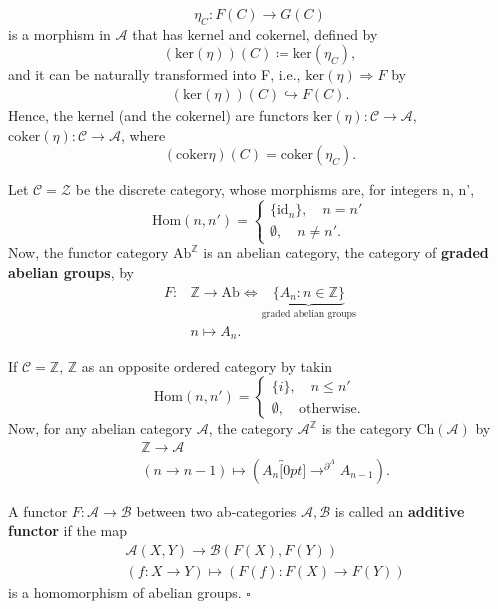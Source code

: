 \documentclass[../category_theory.tex]{subfiles}
\begin{document}
\[
	\eta_{C}:F(C)\rightarrow G(C)
\]
is a morphism in \(\mathcal{A}\) that has kernel and cokernel, defined by
\[
	(\mathrm{ker}(\eta ))(C)\coloneqq \mathrm{ker}(\eta_{C}),
\]
and it can be naturally transformed into F, i.e., \(\mathrm{ker}(\eta )\Rightarrow F\) by
\begin{align*}
	(\mathrm{ker}(\eta ))(C)\hookrightarrow F(C).
\end{align*}
Hence, the kernel (and the cokernel) are functors \(\mathrm{ker}(\eta ):\mathcal{C}\rightarrow \mathcal{A}\), \(\mathrm{coker}(\eta ):\mathcal{C}\rightarrow \mathcal{A}\), where
\[
	(\mathrm{coker}\eta )(C)=\mathrm{coker}(\eta_{C}).
\]
\begin{example}
	Let \(\mathcal{C}=\mathcal{Z}\) be the discrete category, whose morphisms are, for integers n, n',
	\[
		\mathrm{Hom}(n, n') = \left\{\begin{array}{ll}
			\{\mathrm{id}_{n}\},\quad n=n' \\
			\emptyset ,\quad n\neq n'.
		\end{array}\right.
	\]
	Now, the functor category \(\mathrm{Ab}^{\mathbb{Z}}\) is an abelian category, the category of \textbf{graded abelian groups}, by
	\begin{align*}
		F: & \mathbb{Z}\rightarrow \mathrm{Ab} \Longleftrightarrow \underbrace{\{A_{n}:n\in \mathbb{Z}\}}_{\text{graded abelian groups}} \\
		   & n\mapsto A_{n}.
	\end{align*}

	If \(\mathcal{C}=\mathbb{Z}\), \(\mathbb{Z}\) as an opposite ordered category by takin
	\[
		\mathrm{Hom}(n, n') = \left\{\begin{array}{ll}
			\{i\}, \quad n\leq n' \\
			\emptyset ,\quad \text{otherwise}.
		\end{array}\right.
	\]
	Now, for any abelian category \(\mathcal{A}\), the category \(\mathcal{A}^{\mathbb{Z}}\) is the category \(\mathrm{Ch}(\mathcal{A})\) by
	\begin{align*}
		 & \mathbb{Z}\longrightarrow \mathcal{A}                                                   \\
		 & (n\rightarrow n-1)\mapsto (A_{n} \overbracket[0pt]{\rightarrow}^{\partial^{A}}A_{n-1}).
	\end{align*}
\end{example}
\begin{def*}
	A functor \(F:\mathcal{A}\rightarrow \mathcal{B}\) between two ab-categories \(\mathcal{A}, \mathcal{B}\) is called an \textbf{additive functor} if the map
	\begin{align*}
		 & \mathcal{A}(X, Y)\longrightarrow \mathcal{B}(F(X), F(Y)) \\
		 & (f:X\rightarrow Y)\mapsto (F(f):F(X)\rightarrow F(Y))
	\end{align*}
	is a homomorphism of abelian groups. \(\square\)
\end{def*}
\end{document}
